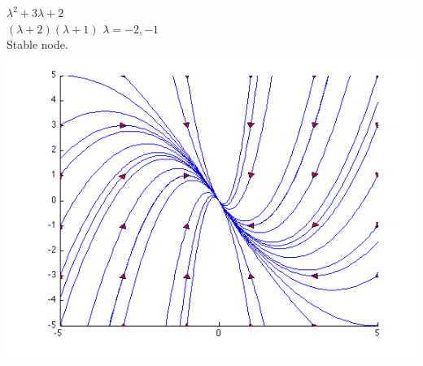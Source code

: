 \documentclass[12pt]{article}
\begin{document}
\(\lambda^2 +3\lambda +2\)\\
\((\lambda + 2)(\lambda + 1)\)
\(\lambda = -2,-1\)\\
Stable node.\\

\includegraphics[scale=.5]{6-4-3c.png}
\end{document}
